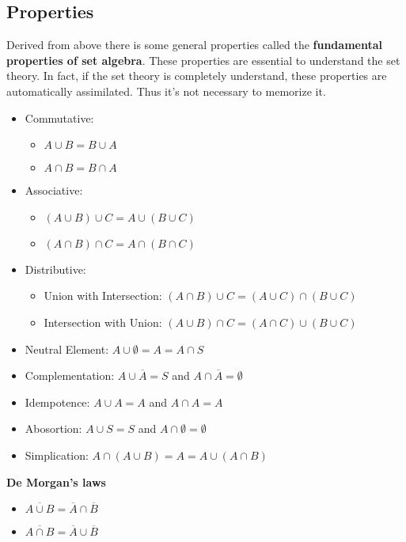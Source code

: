 \subsection{Properties}
Derived from above there is some general properties called the \textbf{fundamental properties of set algebra}. These properties 
are essential to understand the set theory. In fact, if the set theory is completely understand, these properties are automatically 
assimilated. Thus it's not necessary to memorize it. 
\begin{itemize}
   \item Commutative: 
   \begin{itemize}
        \item[] $A \cup B = B \cup A$
        \item[] $A \cap B = B \cap A$
   \end{itemize}
   \item Associative: 
   \begin{itemize}
        \item[] $(A \cup B) \cup C = A \cup (B \cup C)$
        \item[] $(A \cap B) \cap C = A \cap (B \cap C)$
   \end{itemize}
   \item Distributive:
   \begin{itemize}
        \item[] Union with Intersection: $(A \cap B)\cup C = (A\cup C) \cap (B \cup C) $
        \item[] Intersection with Union: $(A \cup B)\cap C = (A\cap C) \cup (B \cup C) $
   \end{itemize}   
   \item Neutral Element: $A \cup \emptyset = A = A \cap S$
   \item Complementation: $A \cup \overline{A} = S$ and $A\cap \overline{A} = \emptyset$
   \item Idempotence: $A \cup A = A$ and $A \cap A = A$
   \item Abosortion: $A \cup S = S$ and $A \cap \emptyset = \emptyset$
   \item Simplication: $A \cap (A \cup B) = A = A \cup (A \cap B)$
\end{itemize}

\textbf{De Morgan's laws}
\begin{itemize}
   \item $\overline{A \cup B} = \overline{A} \cap \overline{B}$
   \item $\overline{A \cap B} = \overline{A} \cup \overline{B}$
\end{itemize}

